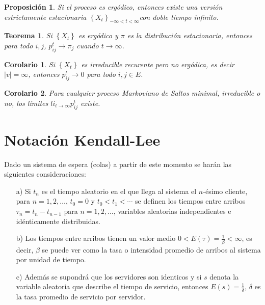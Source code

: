 \documentclass{article}
\newtheorem{Teo}{Teorema}[section]
\newtheorem{Prop}{Proposición}[section]
\newtheorem{Cor}{Corolario}[section]
\numberwithin{equation}{section}
\begin{document}
\begin{Prop}
Si el proceso es erg\'odico, entonces existe una versi\'on estrictamente estacionaria $\left\{X_{t}\right\}_{-\infty<t<\infty}$con doble tiempo infinito.
\end{Prop}

\begin{Teo}
Si $\left\{X_{t}\right\}$ es erg\'odico y $\pi$ es la distribuci\'on estacionaria, entonces para todo $i,j$, $p_{ij}^{t}\rightarrow\pi_{j}$ cuando $t\rightarrow\infty$.
\end{Teo}

\begin{Cor}
Si $\left\{X_{t}\right\}$ es irreducible recurente pero no erg\'odica, es decir $|v|=\infty$, entonces $p_{ij}^{t}\rightarrow0$ para todo $i,j\in E$.
\end{Cor}

\begin{Cor}
Para cualquier proceso Markoviano de Saltos minimal, irreducible o no, los l\'imites $li_{t\rightarrow\infty}p_{ij}^{t}$ existe.
\end{Cor}

\section{Notaci\'on Kendall-Lee}
Dado un sistema de espera (colas) a partir de este momento se har\'an las siguientes consideraciones:
\begin{itemize}
\item[a) ]Si $t_{n}$ es el tiempo aleatorio en el que llega al sistema el $n$-\'esimo cliente, para $n=1,2,\ldots$, $t_{0}=0$ y $t_{0}<t_{1}<\cdots$ se definen los tiempos entre arribos $\tau_{n}=t_{n}-t_{n-1}$ para $n=1,2,\ldots$, variables aleatorias independientes e id\'enticamente distribuidas.

\item[b) ]Los tiempos entre arribos tienen un valor medio $0<E\left(\tau\right)=\frac{1}{\beta}<\infty$, es decir, $\beta$ se puede ver como la tasa o intensidad promedio de arribos al sistema por unidad de tiempo.
\item[c) ]  Adem\'as se supondr\'a que los servidores son identicos y si $s$ denota la variable aleatoria que describe el tiempo de servicio, entonces $E\left(s\right)=\frac{1}{\delta}$, $\delta$ es la tasa promedio de servicio por servidor.
\end{itemize}
\end{document}
